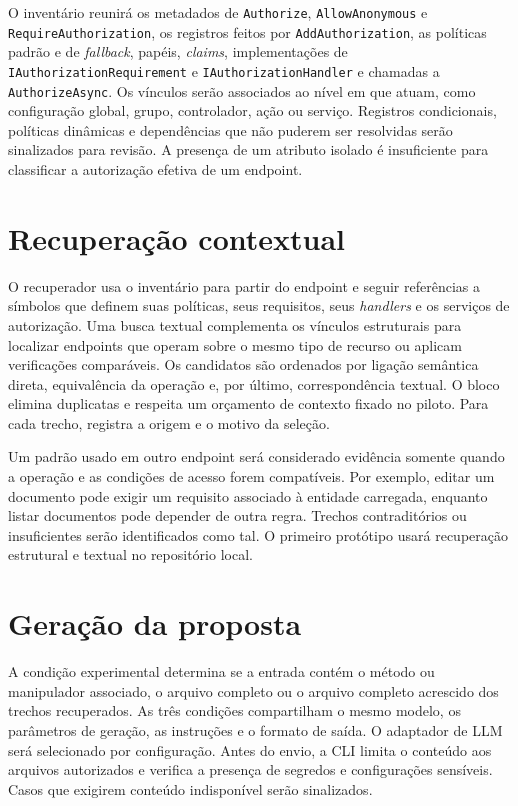 O inventário reunirá os metadados de \texttt{Authorize}, \texttt{AllowAnonymous} e \texttt{RequireAuthorization}, os registros feitos por \texttt{AddAuthorization}, as políticas padrão e de \textit{fallback}, papéis, \textit{claims}, implementações de \texttt{IAuthorizationRequirement} e \texttt{IAuthorizationHandler} e chamadas a \texttt{AuthorizeAsync}. Os vínculos serão associados ao nível em que atuam, como configuração global, grupo, controlador, ação ou serviço. Registros condicionais, políticas dinâmicas e dependências que não puderem ser resolvidas serão sinalizados para revisão. A presença de um atributo isolado é insuficiente para classificar a autorização efetiva de um endpoint.

\section{Recuperação contextual}

O recuperador usa o inventário para partir do endpoint e seguir referências a símbolos que definem suas políticas, seus requisitos, seus \textit{handlers} e os serviços de autorização. Uma busca textual complementa os vínculos estruturais para localizar endpoints que operam sobre o mesmo tipo de recurso ou aplicam verificações comparáveis. Os candidatos são ordenados por ligação semântica direta, equivalência da operação e, por último, correspondência textual. O bloco elimina duplicatas e respeita um orçamento de contexto fixado no piloto. Para cada trecho, registra a origem e o motivo da seleção.

Um padrão usado em outro endpoint será considerado evidência somente quando a operação e as condições de acesso forem compatíveis. Por exemplo, editar um documento pode exigir um requisito associado à entidade carregada, enquanto listar documentos pode depender de outra regra. Trechos contraditórios ou insuficientes serão identificados como tal. O primeiro protótipo usará recuperação estrutural e textual no repositório local.

\section{Geração da proposta}

A condição experimental determina se a entrada contém o método ou manipulador associado, o arquivo completo ou o arquivo completo acrescido dos trechos recuperados. As três condições compartilham o mesmo modelo, os parâmetros de geração, as instruções e o formato de saída. O adaptador de LLM será selecionado por configuração. Antes do envio, a CLI limita o conteúdo aos arquivos autorizados e verifica a presença de segredos e configurações sensíveis. Casos que exigirem conteúdo indisponível serão sinalizados.

